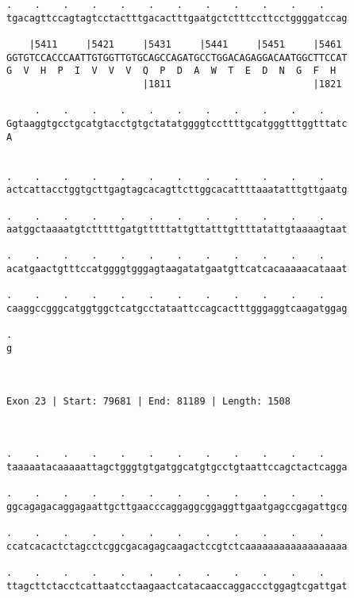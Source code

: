 \documentclass{article}
\begin{document}
\begin{Verbatim}
.    .    .    .    .    .    .    .    .    .    .    .    
tgacagttccagtagtcctactttgacactttgaatgctctttccttcctggggatccag
                                                            
    |5411     |5421     |5431     |5441     |5451     |5461 
GGTGTCCACCCAATTGTGGTTGTGCAGCCAGATGCCTGGACAGAGGACAATGGCTTCCAT
G  V  H  P  I  V  V  V  Q  P  D  A  W  T  E  D  N  G  F  H  
                        |1811                         |1821 
  
     .    .    .    .    .    .    .    .    .    .    .    
Ggtaaggtgcctgcatgtacctgtgctatatggggtccttttgcatgggtttggtttatc
A                                                           
                                                            
  
.    .    .    .    .    .    .    .    .    .    .    .    
actcattacctggtgcttgagtagcacagttcttggcacattttaaatatttgttgaatg
                                                            
.    .    .    .    .    .    .    .    .    .    .    .    
aatggctaaaatgtctttttgatgtttttattgttatttgttttatattgtaaaagtaat
                                                            
.    .    .    .    .    .    .    .    .    .    .    .    
acatgaactgtttccatggggtgggagtaagatatgaatgttcatcacaaaaacataaat
                                                            
.    .    .    .    .    .    .    .    .    .    .    .    
caaggccgggcatggtggctcatgcctataattccagcactttgggaggtcaagatggag
                                                            
.
g
 
 
 
Exon 23 | Start: 79681 | End: 81189 | Length: 1508



.    .    .    .    .    .    .    .    .    .    .    .    
taaaaatacaaaaattagctgggtgtgatggcatgtgcctgtaattccagctactcagga
                                                            
.    .    .    .    .    .    .    .    .    .    .    .    
ggcagagacaggagaattgcttgaacccaggaggcggaggttgaatgagccgagattgcg
                                                            
.    .    .    .    .    .    .    .    .    .    .    .    
ccatcacactctagcctcggcgacagagcaagactccgtctcaaaaaaaaaaaaaaaaaa
                                                            
.    .    .    .    .    .    .    .    .    .    .    .    
ttagcttctacctcattaatcctaagaactcatacaaccaggaccctggagtcgattgat
                                                            

\end{Verbatim}
\end{document}
